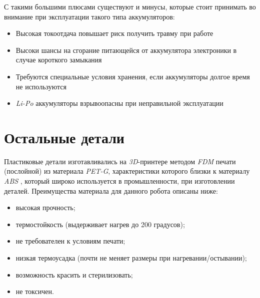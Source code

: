 С такими большими плюсами существуют и минусы, которые стоит принимать во внимание при эксплуатации такого типа аккумуляторов:
\begin{itemize}
    \item Высокая токоотдача повышает риск получить травму при работе
    \item Высоки шансы на сгорание питающейся от аккумулятора электроники в случае короткого замыкания
    \item Требуются специальные условия хранения, если аккумуляторы долгое время не используются
    \item \textit{Li-Po} аккумуляторы взрывоопасны при неправильной эксплуатации
\end{itemize}


\section{Остальные детали}
Пластиковые детали изготавливались на \textit{3D}-принтере методом \textit{FDM} печати (послойной) из материала \textit{PET-G}, характеристики которого близки к материалу \textit{ABS} \cite{Filament2017}, который широко используется в промышленности, при изготовлении деталей. Преимущества материала для данного робота описаны ниже:
\begin{itemize}
    \item высокая прочность; 
    \item термостойкость (выдерживает нагрев до 200 градусов);
    \item не требователен к условиям печати;
    \item низкая термоусадка (почти не меняет размеры при нагревании/остывании);
    \item возможность красить и стерилизовать;
    \item не токсичен.
\end{itemize}
